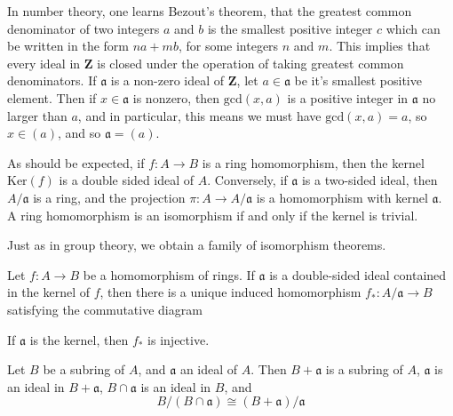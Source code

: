 \begin{example}
    In number theory, one learns Bezout's theorem, that the greatest common denominator of two integers $a$ and $b$ is the smallest positive integer $c$ which can be written in the form $na + mb$, for some integers $n$ and $m$. This implies that every ideal in $\mathbf{Z}$ is closed under the operation of taking greatest common denominators. If $\mathfrak{a}$ is a non-zero ideal of $\mathbf{Z}$, let $a \in \mathfrak{a}$ be it's smallest positive element. Then if $x \in \mathfrak{a}$ is nonzero, then $\text{gcd}(x,a)$ is a positive integer in $\mathfrak{a}$ no larger than $a$, and in particular, this means we must have $\text{gcd}(x,a) = a$, so $x \in (a)$, and so $\mathfrak{a} = (a)$.
\end{example}

\begin{example}
    As should be expected, if $f: A \to B$ is a ring homomorphism, then the kernel $\text{Ker}(f)$ is a double sided ideal of $A$. Conversely, if $\mathfrak{a}$ is a two-sided ideal, then $A/\mathfrak{a}$ is a ring, and the projection $\pi: A \to A/\mathfrak{a}$ is a homomorphism with kernel $\mathfrak{a}$.  A ring homomorphism is an isomorphism if and only if the kernel is trivial.
\end{example}

Just as in group theory, we obtain a family of isomorphism theorems.

\begin{theorem}
    Let $f:A \to B$ be a homomorphism of rings. If $\mathfrak{a}$ is a double-sided ideal contained in the kernel of $f$, then there is a unique induced homomorphism $f_*: A/\mathfrak{a} \to B$ satisfying the commutative diagram
    \begin{center}
    \end{center}
    If $\mathfrak{a}$ is the kernel, then $f_*$ is injective.
\end{theorem}

\begin{theorem}
    Let $B$ be a subring of $A$, and $\mathfrak{a}$ an ideal of $A$. Then $B + \mathfrak{a}$ is a subring of $A$, $\mathfrak{a}$ is an ideal in $B + \mathfrak{a}$, $B \cap \mathfrak{a}$ is an ideal in $B$, and
    \[ B/(B \cap \mathfrak{a}) \cong (B + \mathfrak{a})/\mathfrak{a} \]
\end{theorem}

